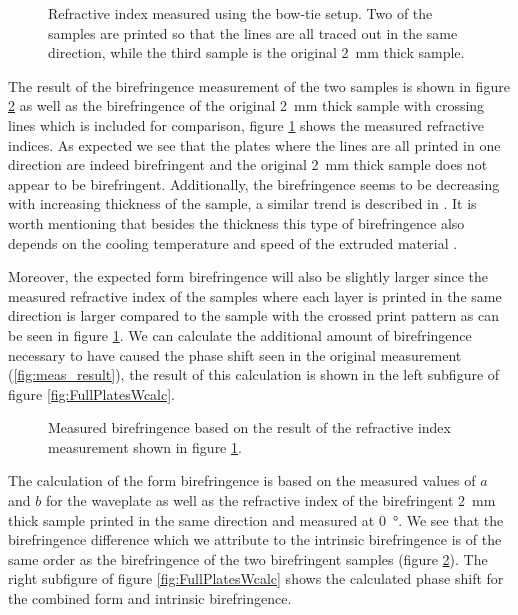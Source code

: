 \begin{figure}[H]
    \centering
    
    \caption{Refractive index measured using the bow-tie setup. Two of the samples are printed so that the lines are all traced out in the same direction, while the third sample is the original \SI{2}{\milli \meter} thick sample.}
    \label{fig:ri_fullplates}
\end{figure}

The result of the birefringence measurement of the two samples is shown in figure \ref{fig:FullPlates_bf} as well as the birefringence of the original \SI{2}{\milli \meter} thick sample with crossing lines which is included for comparison, figure \ref{fig:ri_fullplates} shows the measured refractive indices. As expected we see that the plates where the lines are all printed in one direction are indeed birefringent and the original \SI{2}{\milli \meter} thick sample does not appear to be birefringent. Additionally, the birefringence seems to be decreasing with increasing thickness of the sample, a similar trend is described in \cite{Solr-urn:nbn:de:hebis:04-z2017-0786}. It is worth mentioning that besides the thickness this type of birefringence also depends on the cooling temperature and speed of the extruded material \cite{Solr-urn:nbn:de:hebis:04-z2017-0786}.

Moreover, the expected form birefringence will also be slightly larger since the measured refractive index of the samples where each layer is printed in the same direction is larger compared to the sample with the crossed print pattern as can be seen in figure \ref{fig:ri_fullplates}. We can calculate the additional amount of birefringence necessary to have caused the phase shift seen in the original measurement (\ref{fig:meas_result}), the result of this calculation is shown in the left subfigure of figure \ref{fig:FullPlatesWcalc}. 

\begin{figure}[H]
    \centering
    
    \caption{Measured birefringence based on the result of the refractive index measurement shown in figure \ref{fig:ri_fullplates}.}
    \label{fig:FullPlates_bf}
\end{figure}

The calculation of the form birefringence is based on the measured values of $a$ and $b$ for the waveplate as well as the refractive index of the birefringent \SI{2}{\milli \meter} thick sample printed in the same direction and measured at \SI{0}{\degree}. We see that the birefringence difference which we attribute to the intrinsic birefringence is of the same order as the birefringence of the two birefringent samples (figure \ref{fig:FullPlates_bf}). The right subfigure of figure \ref{fig:FullPlatesWcalc} shows the calculated phase shift for the combined form and intrinsic birefringence.

